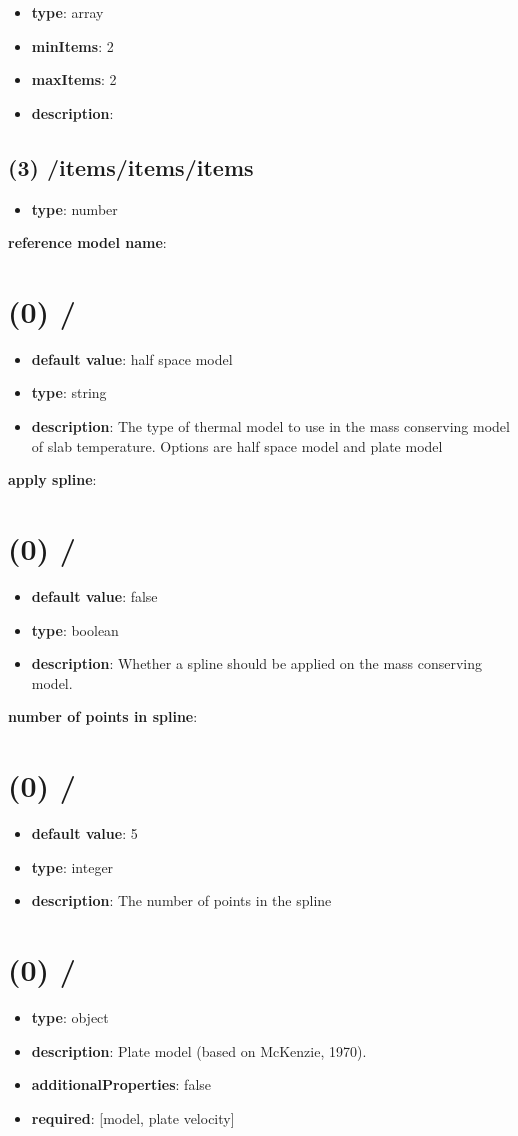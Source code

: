 \begin{itemize}[leftmargin=2em]\item {\bf type}: array
\item {\bf minItems}: 2
\item {\bf maxItems}: 2
\item {\bf description}: 
\end{itemize}\subsection{(3) /items/items/items}
\begin{itemize}[leftmargin=3em]\item {\bf type}: number
\end{itemize}\item {\bf reference model name}: \section{(0) /}
\begin{itemize}[leftmargin=0em]\item {\bf default value}: half space model
\item {\bf type}: string
\item {\bf description}: The type of thermal model to use in the mass conserving model of slab temperature. Options are half space model and plate model
\end{itemize}\item {\bf apply spline}: \section{(0) /}
\begin{itemize}[leftmargin=0em]\item {\bf default value}: false
\item {\bf type}: boolean
\item {\bf description}: Whether a spline should be applied on the mass conserving model.
\end{itemize}\item {\bf number of points in spline}: \section{(0) /}
\begin{itemize}[leftmargin=0em]\item {\bf default value}: 5
\item {\bf type}: integer
\item {\bf description}: The number of points in the spline
\end{itemize}\section{(0) /}
\begin{itemize}[leftmargin=0em]\item {\bf type}: object
\item {\bf description}: Plate model (based on McKenzie, 1970).
\item {\bf additionalProperties}: false
\item {\bf required}: [model, plate velocity]\end{itemize}

